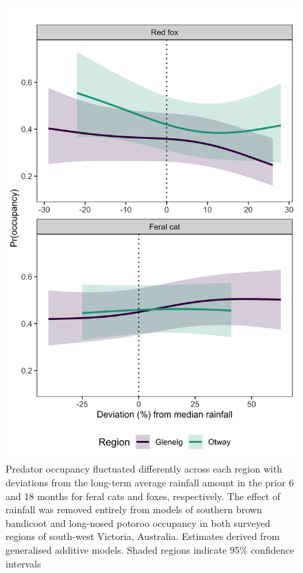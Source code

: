 \documentclass[11pt,a4paper,titlepage,twoside,openright]{style/unimelbthesis}
\begin{document}
\begin{mainmatter}
\begin{figure}
{\centering \includegraphics[width=0.65\linewidth]{figure/rainfall} 

}

\caption{Predator occupancy fluctuated differently across each region with deviations from the long-term average rainfall amount in the prior 6 and 18 months for feral cats and foxes, respectively. The effect of rainfall was removed entirely from models of southern brown bandicoot and long-nosed potoroo occupancy in both surveyed regions of south-west Victoria, Australia. Estimates derived from generalised additive models. Shaded regions indicate 95\% confidence intervals}\label{fig:occ-rainfall}
\end{figure}
\newpage
\begin{figure}


\end{figure}
\end{mainmatter}
\end{document}
